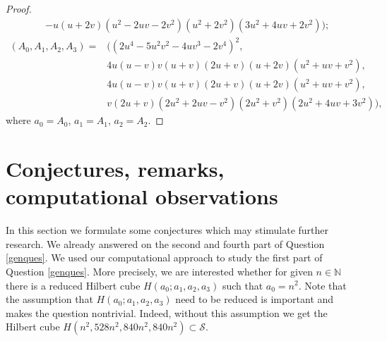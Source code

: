 \documentclass[10pt]{amsart}
\theoremstyle{plain}
\def\cal{\mathcal}
\def\bbb{\mathbb}
\newcommand{\N}{\bbb{N}}
\begin{document}
\begin{proof}
\begin{align*}
	& -u(u + 2v)(u^2 - 2uv - 2v^2)(u^2 + 2v^2)(3u^2 + 4uv + 2v^2) );
\end{align*}
\begin{align*}
	(A_0,A_1,A_2,A_3) = & ((2u^4 - 5u^2v^2 - 4uv^3 - 2v^4)^2, \\
	& 4u(u - v)v(u + v)(2u + v)(u + 2v)(u^2 + uv + v^2), \\
	& 4u(u - v)v(u + v)(2u + v)(u + 2v)(u^2 + uv + v^2), \\
	& v(2u + v)(2u^2 + 2uv - v^2)(2u^2 + v^2)(2u^2 + 4uv + 3v^2)),
\end{align*}
where $a_0=A_0$, $a_1=A_1$, $a_2=A_2$.
\end{proof}

\section{Conjectures, remarks, computational observations}\label{sec4}

In this section we formulate some conjectures which may stimulate further research. We already answered on the second and fourth part of Question \ref{genques}. We used our computational approach to study the first part of Question \ref{genques}. More precisely, we are interested whether for given $n\in\N$ there is a reduced Hilbert cube $H(a_{0}; a_{1}, a_{2}, a_{3})$ such that $a_{0}=n^2$. Note that the assumption that $H(a_{0}; a_{1}, a_{2}, a_{3})$ need to be reduced is important and makes the question nontrivial. Indeed, without this assumption we get the Hilbert cube $H(n^2, 528n^2, 840n^2, 840n^2)\subset \cal{S}$. 
\end{document}
